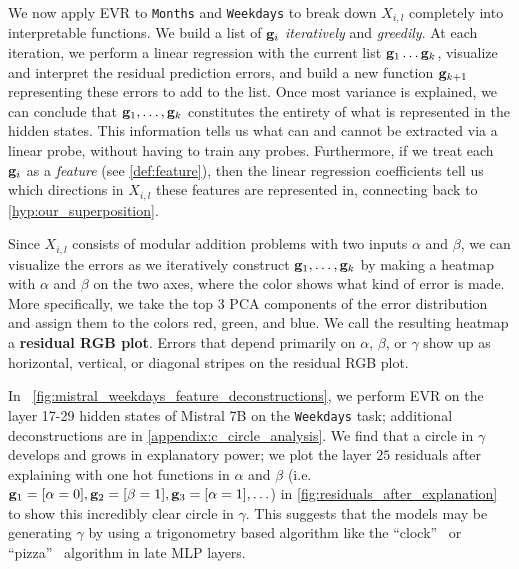 \documentclass{article} %
\theoremstyle{plain}
\theoremstyle{definition}
\begin{document}
We now apply EVR to \texttt{Months} and \texttt{Weekdays} to break down $X_{i, l}$ completely into interpretable functions. We build a list of ${\mathbf g}_i$ \textit{iteratively} and \textit{greedily}. At each iteration, we perform a linear regression with the current list ${\mathbf g}_1\dots {\mathbf g}_k$, visualize and interpret the residual prediction errors, and build a new function ${\mathbf g}_{k+1}$ representing these errors to add to the list. Once most variance is explained, we can conclude that ${\mathbf g}_1,\dots,{\mathbf g}_k$ constitutes the entirety of what is represented in the hidden states. This information tells us what can and cannot be extracted via a linear probe, without having to train any probes. Furthermore, if we treat each ${\mathbf g}_i$ as a \textit{feature} (see \cref{def:feature}), then the linear regression coefficients tell us which directions in $X_{i, l}$ these features are represented in, connecting back to \cref{hyp:our_superposition}.


 Since $X_{i, l}$ consists of modular addition problems with two inputs $\alpha$ and $\beta$, we can visualize the errors as we iteratively construct ${\mathbf g}_1, \ldots, {\mathbf g}_k$ by making a heatmap with $\alpha$ and $\beta$ on the two axes, where the color shows what kind of error is made. More specifically, we take the top 3 PCA components of the error distribution and assign them to the colors red, green, and blue. We call the resulting heatmap a \textbf{residual RGB plot}. Errors that depend primarily on $\alpha$, $\beta$, or $\gamma$ show up as horizontal, vertical, or diagonal stripes on the residual RGB plot.


In ~\cref{fig:mistral_weekdays_feature_deconstructions}, we perform EVR on the layer 17-29 hidden states of Mistral 7B on the \texttt{Weekdays} task; additional deconstructions are in \cref{appendix:c_circle_analysis}. We find that a circle in $\gamma$ develops and grows in explanatory power; we plot the layer $25$ residuals after explaining with one hot functions in $\alpha$ and $\beta$ (i.e. ${\mathbf g}_1 = [\alpha = 0], {\mathbf g}_2 = [\beta = 1], {\mathbf g}_3 = [\alpha = 1], \ldots$) in \cref{fig:residuals_after_explanation} to show this incredibly clear circle in $\gamma$. This suggests that the models may be generating $\gamma$ by using a trigonometry based algorithm like the ``clock''~\citep{neel_grokking} or ``pizza''~\citep{clock_and_pizza} algorithm in late MLP layers. 
 
\end{document}
